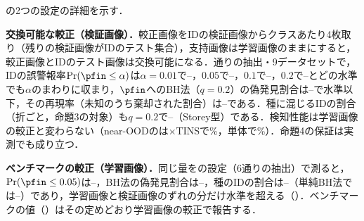 の2つの設定の詳細を示す．

\textbf{交換可能な較正（検証画像）．}較正画像をIDの検証画像からクラスあたり4枚取り（残りの検証画像がIDのテスト集合），支持画像は学習画像のままにすると，較正画像とIDのテスト画像は交換可能になる．\NVcalNSplits{}通りの抽出・9データセットで，IDの誤警報率$\Pr(\pfin\le\alpha)$は$\alpha{=}0.01$で\NVcalFprZeroZeroOneMin{}--\NVcalFprZeroZeroOneMax{}，$0.05$で\NVcalFprZeroZeroFiveMin{}--\NVcalFprZeroZeroFiveMax{}，$0.1$で\NVcalFprZeroOneMin{}--\NVcalFprZeroOneMax{}，$0.2$で\NVcalFprZeroTwoMin{}--\NVcalFprZeroTwoMax{}とどの水準でも$\alpha$のまわりに収まり，$\pfin$へのBH法（$q{=}0.2$）の偽発見割合は\NVcalBhFdpMin{}--\NVcalBhFdpMax{}で水準以下，その再現率（未知のうち棄却された割合）は\NVcalBhRecallMin{}--\NVcalBhRecallMax{}である．種に混じるIDの割合（折ごと，命題3の対象）も$q{=}0.2$で\NVcalIdfracStoreyMin{}--\NVcalIdfracStoreyMax{}（Storey型）である．検知性能は学習画像の較正と変わらない（near-OODの\FPR{}は$\times$TINSで\NVcalMainNearFpr\%，単体で\NVcalAloneNearFpr\%）．命題4の保証は実測でも成り立つ．

\textbf{ベンチマークの較正（学習画像）．}同じ量をの設定（6通りの抽出）で測ると，$\Pr(\pfin\le0.05)$は\NVtrainFprZeroZeroFiveMin{}--\NVtrainFprZeroZeroFiveMax{}，BH法の偽発見割合は\NVtrainBhFdpMin{}--\NVtrainBhFdpMax{}，種のIDの割合は\NVtrainIdfracStoreyMin{}--\NVtrainIdfracStoreyMax{}（単純BH法では\NVtrainIdfracBhMin{}--\NVtrainIdfracBhMax{}）であり，学習画像と検証画像のずれの分だけ水準を超える（）．ベンチマークの値（）はその定めどおり学習画像の較正で報告する．
